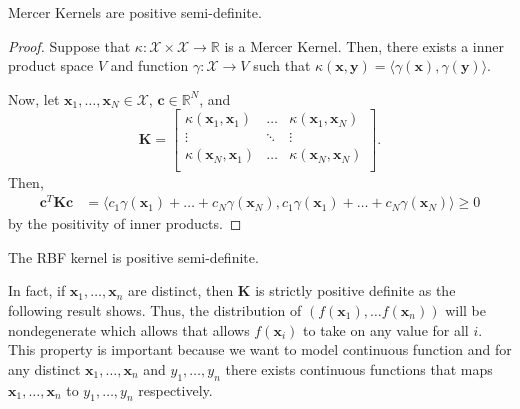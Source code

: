 \begin{lemma}
    Mercer Kernels are positive semi-definite.
\end{lemma}
\begin{proof}
    Suppose that $\kappa: \mathcal{X} \times \mathcal{X} \to \mathbb{R}$ is a Mercer Kernel.
    Then, there exists a inner product space $V$ and function $\gamma: \mathcal{X} \to V$ such that $\kappa(\mathbf{x}, \mathbf{y}) = \langle\gamma(\mathbf{x}), \gamma(\mathbf{y})\rangle$.

    Now, let $\mathbf{x}_1, \dots, \mathbf{x}_N \in \mathcal{X}$, $\mathbf{c} \in \mathbb{R}^{N}$, and
    \begin{equation*}
        \mathbf{K} =
        \begin{bmatrix}
            \kappa(\mathbf{x}_1, \mathbf{x}_1) & \dots & \kappa(\mathbf{x}_1, \mathbf{x}_N) \\
            \vdots & \ddots & \vdots \\
            \kappa(\mathbf{x}_N, \mathbf{x}_1) & \dots & \kappa(\mathbf{x}_N, \mathbf{x}_N) \\
        \end{bmatrix}
        .
    \end{equation*}
    Then,
    \begin{align*}
        \mathbf{c}^{T} \mathbf{K} \mathbf{c}
        & = \langle c_1 \gamma(\mathbf{x}_1) + \dots + c_N \gamma(\mathbf{x}_N), c_1 \gamma(\mathbf{x}_1) + \dots + c_N \gamma(\mathbf{x}_N) \rangle
        \geq 0
    \end{align*}
    by the positivity of inner products.
\end{proof}

\begin{corollary}
    \label{corr:rbf-psd}
    The RBF kernel is positive semi-definite.
\end{corollary}

In fact, if $\mathbf{x}_1, \dots, \mathbf{x}_n$ are distinct, then $\mathbf{K}$ is strictly positive definite as the following result shows.
Thus, the distribution of $(f(\mathbf{x}_1), \dots f(\mathbf{x}_n))$ will be nondegenerate which allows that allows $f(\mathbf{x}_i)$ to take on any value for all $i$.
This property is important because we want to model continuous function and for any distinct $\mathbf{x}_1, \dots, \mathbf{x}_n$ and $y_1, \dots, y_n$ there exists continuous functions that maps $\mathbf{x}_1, \dots, \mathbf{x}_n$ to $y_1, \dots, y_n$ respectively.

